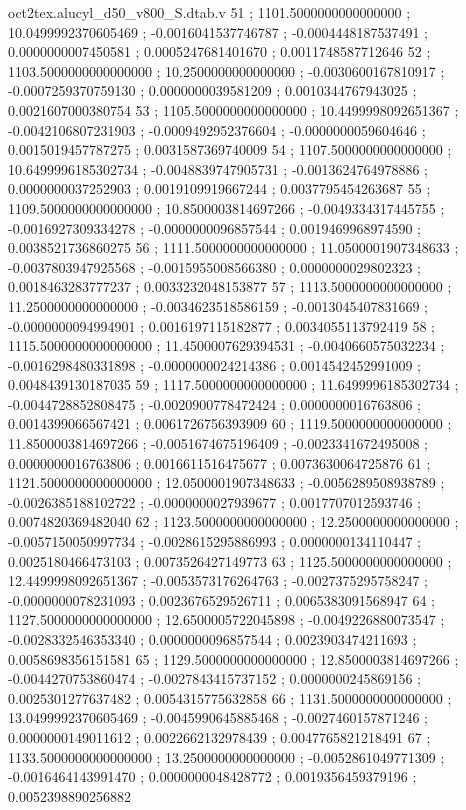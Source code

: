 \begin{filecontents}[overwrite]{oct2tex.alucyl_d50_v800_S.dtab.v}
51 ; 1101.5000000000000000 ; 10.0499992370605469 ; -0.0016041537746787 ; -0.0004448187537491 ; 0.0000000007450581 ; 0.0005247681401670 ; 0.0011748587712646
52 ; 1103.5000000000000000 ; 10.2500000000000000 ; -0.0030600167810917 ; -0.0007259370759130 ; 0.0000000039581209 ; 0.0010344767943025 ; 0.0021607000380754
53 ; 1105.5000000000000000 ; 10.4499998092651367 ; -0.0042106807231903 ; -0.0009492952376604 ; -0.0000000059604646 ; 0.0015019457787275 ; 0.0031587369740009
54 ; 1107.5000000000000000 ; 10.6499996185302734 ; -0.0048839747905731 ; -0.0013624764978886 ; 0.0000000037252903 ; 0.0019109919667244 ; 0.0037795454263687
55 ; 1109.5000000000000000 ; 10.8500003814697266 ; -0.0049334317445755 ; -0.0016927309334278 ; -0.0000000096857544 ; 0.0019469968974590 ; 0.0038521736860275
56 ; 1111.5000000000000000 ; 11.0500001907348633 ; -0.0037803947925568 ; -0.0015955008566380 ; 0.0000000029802323 ; 0.0018463283777237 ; 0.0033232048153877
57 ; 1113.5000000000000000 ; 11.2500000000000000 ; -0.0034623518586159 ; -0.0013045407831669 ; -0.0000000094994901 ; 0.0016197115182877 ; 0.0034055113792419
58 ; 1115.5000000000000000 ; 11.4500007629394531 ; -0.0040660575032234 ; -0.0016298480331898 ; -0.0000000024214386 ; 0.0014542452991009 ; 0.0048439130187035
59 ; 1117.5000000000000000 ; 11.6499996185302734 ; -0.0044728852808475 ; -0.0020900778472424 ; 0.0000000016763806 ; 0.0014399066567421 ; 0.0061726756393909
60 ; 1119.5000000000000000 ; 11.8500003814697266 ; -0.0051674675196409 ; -0.0023341672495008 ; 0.0000000016763806 ; 0.0016611516475677 ; 0.0073630064725876
61 ; 1121.5000000000000000 ; 12.0500001907348633 ; -0.0056289508938789 ; -0.0026385188102722 ; -0.0000000027939677 ; 0.0017707012593746 ; 0.0074820369482040
62 ; 1123.5000000000000000 ; 12.2500000000000000 ; -0.0057150050997734 ; -0.0028615295886993 ; 0.0000000134110447 ; 0.0025180466473103 ; 0.0073526427149773
63 ; 1125.5000000000000000 ; 12.4499998092651367 ; -0.0053573176264763 ; -0.0027375295758247 ; -0.0000000078231093 ; 0.0023676529526711 ; 0.0065383091568947
64 ; 1127.5000000000000000 ; 12.6500005722045898 ; -0.0049226880073547 ; -0.0028332546353340 ; 0.0000000096857544 ; 0.0023903474211693 ; 0.0058698356151581
65 ; 1129.5000000000000000 ; 12.8500003814697266 ; -0.0044270753860474 ; -0.0027843415737152 ; 0.0000000245869156 ; 0.0025301277637482 ; 0.0054315775632858
66 ; 1131.5000000000000000 ; 13.0499992370605469 ; -0.0045990645885468 ; -0.0027460157871246 ; 0.0000000149011612 ; 0.0022662132978439 ; 0.0047765821218491
67 ; 1133.5000000000000000 ; 13.2500000000000000 ; -0.0052861049771309 ; -0.0016464143991470 ; 0.0000000048428772 ; 0.0019356459379196 ; 0.0052398890256882

\end{filecontents}
